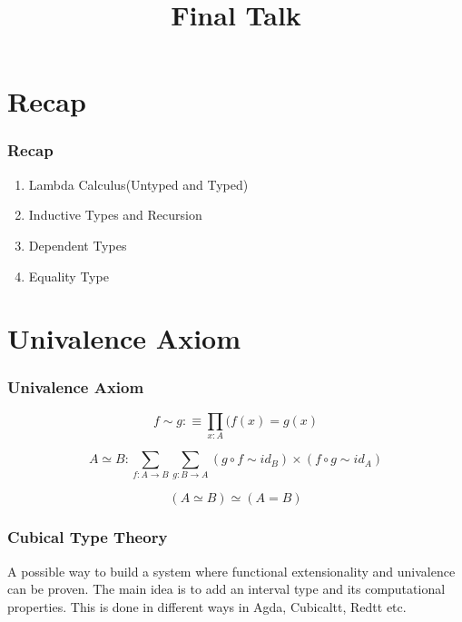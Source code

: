 \documentclass[14pt,compress]{beamer}
\title{Final Talk}
\date{}
\begin{document}

\begin{frame}\label{frame : titlepage}
\titlepage
\end{frame}

\section{Recap}

\begin{frame}\label{frame : recap}
\frametitle{Recap}

\begin{enumerate}
\item Lambda Calculus(Untyped and Typed)
\item Inductive Types and Recursion
\item Dependent Types
\item Equality Type
\end{enumerate}
\end{frame}

\section{Univalence Axiom}

\begin{frame}

\frametitle{Univalence Axiom}

\[ f \sim g : \equiv \prod_{x : A} (f(x) = g(x) \]
\pause

\[ A  \simeq B : \sum_{f : A \to B} \sum_{g : B \to A}
  (g \circ f \sim id_B) \times (f \circ g \sim id_A) \]
\pause

\textcolor{beamer@mathtext}{
\[ (A \simeq B) \simeq (A = B) \] }
\end{frame}

\begin{frame}
\frametitle{Cubical Type Theory}

A possible way to build a system where functional extensionality and
univalence can be proven.
The main idea is to add an interval type and its computational properties.
This is done in different ways in Agda, Cubicaltt, Redtt etc.

\end{frame}

\end{document}
